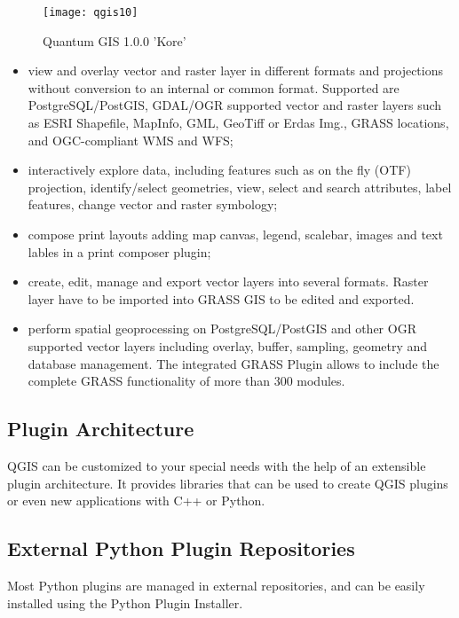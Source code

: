 \begin{figure}[h]
   \begin{center}
   \caption{Quantum GIS 1.0.0 'Kore'}\label{fig:qgis10}\smallskip
   \texttt{[image: qgis10]}
\end{center}
\end{figure}

\begin{itemize}
\item view and overlay vector and raster layer in different formats and
projections without conversion to an internal or common format. Supported are
PostgreSQL/PostGIS, GDAL/OGR supported vector and raster layers such as ESRI
Shapefile, MapInfo, GML, GeoTiff or Erdas Img., GRASS locations, and
OGC-compliant WMS and WFS;
\item interactively explore data, including features such as on the fly
(OTF) projection, identify/select geometries, view, select and search
attributes, label features, change vector and raster symbology; 
\item compose print layouts adding map canvas, legend, scalebar, images and
text lables in a print composer plugin;
\item create, edit, manage and export vector layers into several formats.
Raster layer have to be imported into GRASS GIS to be edited and
exported. 
\item perform spatial geoprocessing on PostgreSQL/PostGIS and other OGR
supported vector layers including overlay, buffer, sampling, geometry and
database management. The integrated GRASS Plugin allows to include the
complete GRASS functionality of more than 300 modules.
\end{itemize}

\subsection{Plugin Architecture}

QGIS can be customized to your special needs with the help of an extensible
plugin architecture. It provides libraries that can be used to create
QGIS plugins or even new applications with C++ or Python. 

\subsection{External Python Plugin Repositories}

Most Python plugins are managed in external repositories, and can be easily
installed using the Python Plugin Installer.

